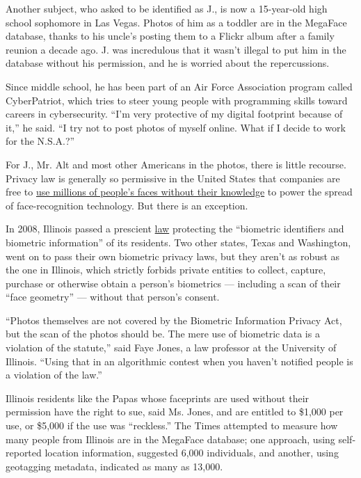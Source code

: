 Another subject, who asked to be identified as J., is now a 15-year-old
high school sophomore in Las Vegas. Photos of him as a toddler are in
the MegaFace database, thanks to his uncle's posting them to a Flickr
album after a family reunion a decade ago. J. was incredulous that it
wasn't illegal to put him in the database without his permission, and he
is worried about the repercussions.

Since middle school, he has been part of an Air Force Association
program called CyberPatriot, which tries to steer young people with
programming skills toward careers in cybersecurity. ``I'm very
protective of my digital footprint because of it,'' he said. ``I try not
to post photos of myself online. What if I decide to work for the
N.S.A.?''

For J., Mr. Alt and most other Americans in the photos, there is little
recourse. Privacy law is generally so permissive in the United States
that companies are free to
\href{https://www.nytimes3xbfgragh.onion/2019/07/13/technology/databases-faces-facial-recognition-technology.html}{use
millions of people's faces without their knowledge} to power the spread
of face-recognition technology. But there is an exception.

In 2008, Illinois passed a prescient
\href{http://www.ilga.gov/legislation/ilcs/ilcs3.asp?ActID=3004\&ChapterID=57}{law}
protecting the ``biometric identifiers and biometric information'' of
its residents. Two other states, Texas and Washington, went on to pass
their own biometric privacy laws, but they aren't as robust as the one
in Illinois, which strictly forbids private entities to collect,
capture, purchase or otherwise obtain a person's biometrics ---
including a scan of their ``face geometry'' --- without that person's
consent.

``Photos themselves are not covered by the Biometric Information Privacy
Act, but the scan of the photos should be. The mere use of biometric
data is a violation of the statute,'' said Faye Jones, a law professor
at the University of Illinois. ``Using that in an algorithmic contest
when you haven't notified people is a violation of the law.''

Illinois residents like the Papas whose faceprints are used without
their permission have the right to sue, said Ms. Jones, and are entitled
to \$1,000 per use, or \$5,000 if the use was ``reckless.'' The Times
attempted to measure how many people from Illinois are in the MegaFace
database; one approach, using self-reported location information,
suggested 6,000 individuals, and another, using geotagging metadata,
indicated as many as 13,000.

